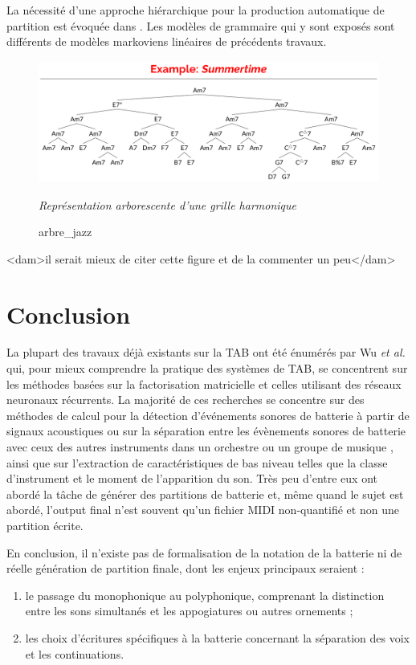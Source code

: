 La nécessité d’une approche hiérarchique pour la production automatique de
partition est évoquée dans \cite{foscarin:hal-01988990}. 
Les modèles de grammaire qui y sont exposés sont différents de modèles
markoviens linéaires de précédents travaux.
\begin{figure}[h]
	\centering
	\includegraphics[height=40mm, width=120mm]{
    z_images/2_etat_de_l_art/1_summertime_tree.png}
	\caption{arbre\_jazz}
	\textit{Représentation arborescente d’une grille harmonique}
    \cite{harasimjazz}
\end{figure}
<dam>il serait mieux de citer cette figure et de la commenter un peu</dam>

\section*{Conclusion}
La plupart des travaux déjà existants sur la TAB ont été énumérés par Wu
\textit{et al.} \cite{Review_ADT} qui, pour mieux comprendre la pratique des
systèmes de TAB, se concentrent sur les méthodes basées sur la factorisation
matricielle et celles utilisant des réseaux neuronaux récurrents. La majorité
de ces recherches se concentre sur des méthodes de calcul pour la détection
d'événements sonores de batterie à partir de signaux acoustiques ou sur la
séparation entre les évènements sonores de batterie avec ceux des autres
instruments dans un orchestre ou un groupe de musique \cite{2802}, ainsi que
sur l'extraction de caractéristiques de bas niveau telles que la classe
d'instrument et le moment de l'apparition du son. Très peu d'entre eux ont
abordé la tâche de générer des partitions de batterie et, même quand le sujet
est abordé, l’output final n’est souvent qu’un fichier MIDI non-quantifié et
non une partition écrite.

En conclusion, il n’existe pas de formalisation de la notation de la batterie
ni de réelle génération de partition finale, dont les enjeux principaux
seraient :
\begin{enumerate}
    \item le passage du monophonique au polyphonique, comprenant la distinction
        entre les sons simultanés et les appogiatures ou autres ornements ;
    \item les choix d’écritures spécifiques à la batterie concernant la
        séparation des voix et les continuations.
\end{enumerate}
